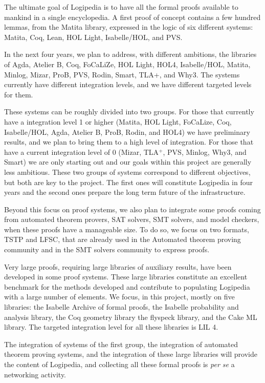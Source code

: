 The ultimate goal of Logipedia is to have all the formal proofs
available to mankind in a single encyclopedia.  A first proof of
concept contains a few hundred lemmas, from the Matita library,
expressed in the logic of six different systems: Matita, Coq, Lean,
HOL Light, Isabelle/HOL, and PVS.

In the next four years, we plan to address, with different ambitions,
the libraries of Agda, Atelier B, Coq, FoCaLiZe, HOL Light, HOL4,
Isabelle/HOL, Matita, Minlog, Mizar, ProB, PVS, Rodin, Smart, TLA+,
and Why3.  The systems currently have different integration levels,
and we have different targeted levels for them.

These systems can be roughly divided into two groups.  For those that
currently have a integration level 1 or higher (Matita, HOL Light,
FoCaLize, Coq, Isabelle/HOL, Agda, Atelier B, ProB, Rodin, and HOL4)
we have preliminary results, and we plan to bring them to a high level
of integration.  For those that have a current integration level of 0
(Mizar, TLA$^+$, PVS, Minlog, Why3, and Smart) we are only starting
out and our goals within this project are generally less ambitious.
These two groups of systems correspond to different objectives, but
both are key to the project. The first ones will constitute Logipedia
in four years and the second ones prepare the long term future of the
infrastructure.

Beyond this focus on proof systems, we also plan to integrate some
proofs coming from automated theorem provers, SAT solvers, SMT
solvers, and model checkers, when these proofs have a manageable
size. To do so, we focus on two formats, TSTP and LFSC, that are
already used in the Automated theorem proving community and in the SMT
solvers community to express proofs.

Very large proofs, requiring large libraries of auxiliary results,
have been developed in some proof systems. These large libraries
constitute an excellent benchmark for the methods developed and
contribute to populating Logipedia with a large number of elements.
We focus, in this project, mostly on five libraries: the Isabelle
Archive of formal proofs, the Isabelle probability and analysis
library, the Coq geometry library the flyspeck library, and the Cake
ML library.  The targeted integration level for all these libraries is
LIL 4.

The integration of systems of the first group, the integration of
automated theorem proving systems, and the integration of these large
libraries will provide the content of Logipedia, and collecting all
these formal proofs is {\em per se} a networking activity.

